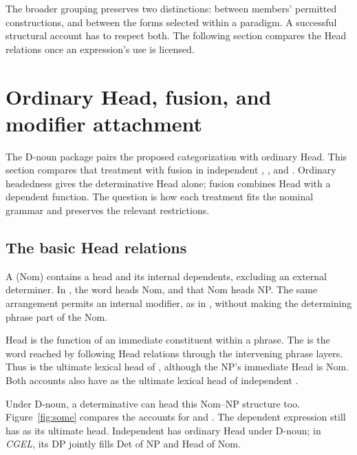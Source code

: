 \documentclass[12pt]{article}
\begin{document}
The broader grouping preserves two distinctions: between members' permitted constructions, and between the forms selected within a paradigm. A successful structural account has to respect both. The following section compares the Head relations once an expression's use is licensed.

\section{Ordinary Head, fusion, and modifier attachment}\label{sec:evidence}

The D-noun package pairs the proposed categorization with ordinary Head. This section compares that treatment with fusion in independent , , and . Ordinary headedness gives the determinative Head alone; fusion combines Head with a dependent function. The question is how each treatment fits the nominal grammar and preserves the relevant restrictions.

\subsection{The basic Head relations}\label{sec:head-relations}

A  (Nom) contains a head and its internal dependents, excluding an external determiner. In , the word  heads Nom, and that Nom heads NP. The same arrangement permits an internal modifier, as in , without making the determining phrase part of the Nom.

Head is the function of an immediate constituent within a phrase. The  is the word reached by following Head relations through the intervening phrase layers. Thus  is the ultimate lexical head of , although the NP's immediate Head is Nom. Both accounts also have  as the ultimate lexical head of independent .

Under D-noun, a determinative can head this Nom--NP structure too. Figure~\ref{fig:some} compares the accounts for  and . The dependent expression still has  as its ultimate head. Independent  has ordinary Head under D-noun; in \textit{CGEL}, its DP jointly fills Det of NP and Head of Nom.
\end{document}
